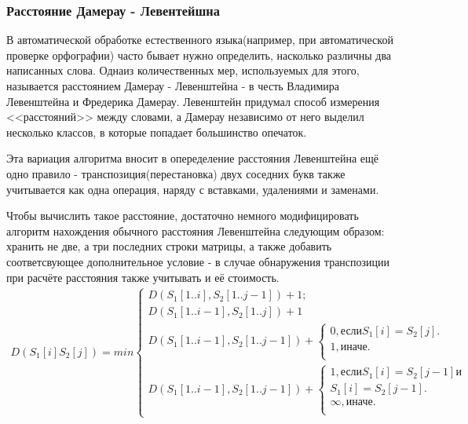 \documentclass[a4paper]{article}
\begin{document}
	\subsubsection{Расстояние Дамерау - Левентейшна}
	В автоматической обработке естественного языка(например, при автоматической проверке орфографии) часто бывает нужно определить, насколько различны два написанных слова. Однаиз количественных мер, используемых для этого, называется расстоянием Дамерау - Левенштейна - в честь Владимира Левенштейна и Фредерика Дамерау. Левенштейн придумал способ измерения <<расстояний>> между словами, а Дамерау независимо от него выделил несколько классов, в которые попадает большинство опечаток.
	
	Эта вариация алгоритма вносит в опеределение расстояния Левенштейна ещё одно правило - транспозиция(перестановка) двух соседних букв также учитывается как одна операция, наряду с вставками, удалениями и заменами.
	
	Чтобы вычислить такое расстояние, достаточно немного модифицировать алгоритм нахождения обычного расстояния Левенштейна следующим образом: хранить  не две, а три последних строки матрицы, а также добавить соответсвующее дополнительное условие - в случае обнаружения транспозиции при расчёте расстояния также учитывать и её стоимость.
	\begin {multline}
		D(S_1[i]S_2[j]) = min 
		\begin{cases}
			D(S_1[1..i], S_2[1..j-1]) + 1;\\
			D(S_1[1..i-1], S_2[1..j]) + 1\\
			D(S_1[1..i-1], S_2[1..j-1]) + \begin{cases}
				0, \text {если}  S_1[i] = S_2[j].\\
				1, \text{иначе}.\\
			\end{cases}\\
			D(S_1[1..i-1], S_2[1..j-1])+ \begin{cases}
				1, \text {если} S_1[i] = S_2[j-1] \text{и}\\
				                S_1[i]=S_2[j-1].\\
				\infty, \text{иначе}.\\
			\end{cases}	
		\end{cases}
		\label{formula_2}
	\end{multline}
\end{document}
